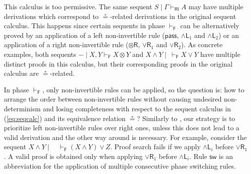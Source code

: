 \documentclass[submission,copyright,creativecommons]{eptcs}
\theoremstyle{definition}
\newcommand{\tr}{\otimes \mathsf{R}}
\newcommand{\pass}{\mathsf{pass}}
\newcommand{\andlone}{\land \mathsf{L}_{1}}
\newcommand{\andltwo}{\land \mathsf{L}_{2}}
\newcommand{\andli}{\land \mathsf{L}_{i}}
\newcommand{\orrone}{\lor \mathsf{R}_{1}}
\newcommand{\orrtwo}{\lor \mathsf{R}_{2}}
\newcommand{\ot}{\otimes}
\newcommand{\RI}{\mathsf{RI}}
\newcommand{\F}{\mathsf{F}}
\newcommand{\sw}{\mathsf{sw}}
\newcommand\niccolo[1]{\mbox{}
{\marginpar{\color{red}NV}}
{\sf\noindent\color{red}#1}}%
\begin{document}
This calculus is too permissive. The same sequent $S \mid \Gamma \vdash_{\RI} A$ may have multiple derivations which correspond to $\circeq$-related derivations in the original sequent calculus. This happens since certain sequents in phase $\vdash_\F$ can be alternatively proved by an application of a left non-invertible rule ($\pass$, $\andlone$ and $\andltwo$) or an application of a right non-invertible rule ($\tr$, $\orrone$ and $\orrtwo$). As concrete  examples, both sequents $- \mid X , Y \vdash_{\F} X \ot Y$ and $X \land Y \mid ~ \vdash_{\F} X \lor Y$ have multiple distinct proofs in this calculus, but their corresponding proofs in the original calculus are $\circeq$-related.

In phase $\vdash_\F$, only non-invertible rules can be applied, so the question is: how to arrange the order between non-invertible rules without causing undesired non-determinism and losing completeness with respect to the sequent calculus in (\ref{eq:seqcalc}) and its equivalence relation $\circeq$? Similarly to \cite{UVW:protsn}, our strategy is to prioritize left non-invertible rules over right ones, unless this does not lead to a valid derivation and the other way around is necessary.
For example, consider the sequent $X \land Y \mid \quad \vdash_{\F} (X \land Y) \lor Z$. Proof search fails if we apply $\andli$ before $\orrone$. A valid proof is obtained only when applying $\orrone$ before $\andli$. Rule $\sw$ is an abbreviation for the application of multiple consecutive phase switching rules.
\end{document}
